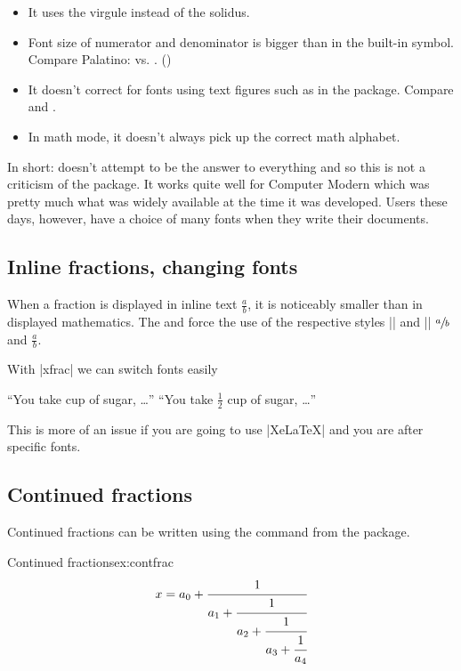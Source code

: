  \begin{itemize}
  \item It uses the virgule instead of the solidus.
  \item Font size of numerator and denominator is bigger than in the
    built-in symbol. Compare Palatino: 
    vs. . ()

  \item It doesn't correct for fonts using text figures such as in the
     package. Compare  and
    .
  \item In math mode, it doesn't always pick up the correct math
    alphabet.
 \end{itemize}

In short:  doesn't attempt to be the answer to
everything and so this is not a criticism of the package. It works
quite well for Computer Modern which was pretty much what was widely
available at the time it was developed. Users these days, however,
have a choice of many fonts when they write their documents.

\subsection{Inline fractions, changing fonts}

When a fraction is displayed in inline text $\frac{a}{b}$, it is noticeably smaller than in
displayed mathematics. The  and  force the use of the respective styles |\textstyle| and |\displaystyle| $\sfrac{a}{b}$ and $\tfrac{a}{b}$. 

With |xfrac| we can switch fonts easily

 ``You take  cup of sugar, \ldots''
``You take $\tfrac{1}{2}$ cup of sugar, \ldots''

This is more of an issue if you are going to use |XeLaTeX| and 
you are after specific fonts.

\subsection{Continued fractions}

Continued fractions can be written using the  command from the  package.

\begin{texexample}{Continued fractions}{ex:contfrac}
\begin{equation}
  x = a_0 + \cfrac{1}{a_1 
          + \cfrac{1}{a_2 
          + \cfrac{1}{a_3 + \cfrac{1}{a_4}}}}
\end{equation}
\end{texexample}

